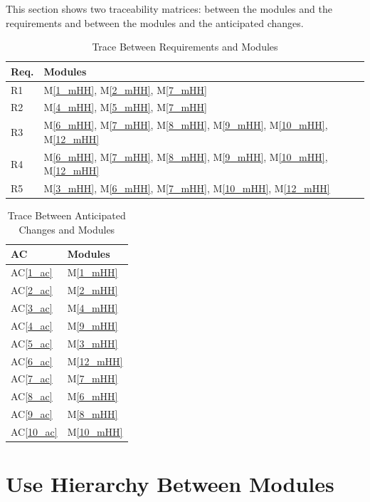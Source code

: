 \documentclass[12pt, titlepage]{article}
\newcommand{\acref}[1]{AC\ref{#1}}
\newcommand{\mref}[1]{M\ref{#1}}
\begin{document}
This section shows two traceability matrices: between the modules and the
requirements and between the modules and the anticipated changes.

\begin{table}[H]
\centering
\begin{tabular}{p{} p{}}
\toprule
\textbf{Req.} & \textbf{Modules}\\
\midrule
R1 & \mref{1_mHH}, \mref{2_mHH}, \mref{7_mHH}\\
R2 & \mref{4_mHH}, \mref{5_mHH}, \mref{7_mHH}\\
R3 & \mref{6_mHH}, \mref{7_mHH}, \mref{8_mHH}, \mref{9_mHH}, \mref{10_mHH}, \mref{12_mHH}\\
R4 & \mref{6_mHH}, \mref{7_mHH}, \mref{8_mHH}, \mref{9_mHH}, \mref{10_mHH}, \mref{12_mHH}\\
R5 & \mref{3_mHH}, \mref{6_mHH}, \mref{7_mHH}, \mref{10_mHH}, \mref{12_mHH}\\
\bottomrule
\end{tabular}
\caption{Trace Between Requirements and Modules}
\label{TblRT}
\end{table}

\begin{table}[H]
\centering
\begin{tabular}{p{} p{}}
\toprule
\textbf{AC} & \textbf{Modules}\\
\midrule
\acref{1_ac} & \mref{1_mHH}\\
\acref{2_ac} & \mref{2_mHH}\\
\acref{3_ac} & \mref{4_mHH}\\
\acref{4_ac} & \mref{9_mHH}\\
\acref{5_ac} & \mref{3_mHH}\\
\acref{6_ac} & \mref{12_mHH}\\
\acref{7_ac} & \mref{7_mHH}\\
\acref{8_ac} & \mref{6_mHH}\\
\acref{9_ac} & \mref{8_mHH}\\
\acref{10_ac} & \mref{10_mHH}\\
\bottomrule
\end{tabular}
\caption{Trace Between Anticipated Changes and Modules}
\label{TblACT}
\end{table}

\section{Use Hierarchy Between Modules} \label{SecUse}
\end{document}
